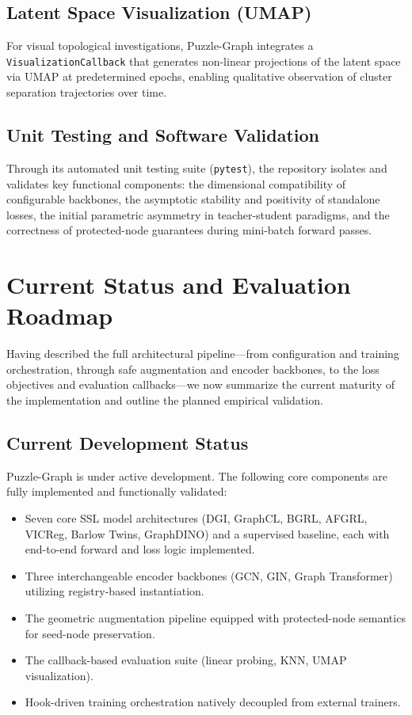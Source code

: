\documentclass[conference]{IEEEtran}
\begin{document}
\subsection{Latent Space Visualization (UMAP)}
For visual topological investigations, Puzzle-Graph integrates a \texttt{VisualizationCallback} that generates non-linear projections of the latent space via UMAP at predetermined epochs, enabling qualitative observation of cluster separation trajectories over time.

\subsection{Unit Testing and Software Validation}
Through its automated unit testing suite (\texttt{pytest}), the repository isolates and validates key functional components: the dimensional compatibility of configurable backbones, the asymptotic stability and positivity of standalone losses, the initial parametric asymmetry in teacher-student paradigms, and the correctness of protected-node guarantees during mini-batch forward passes.

\section{Current Status and Evaluation Roadmap}
\label{sec:results}
Having described the full architectural pipeline---from configuration and training orchestration, through safe augmentation and encoder backbones, to the loss objectives and evaluation callbacks---we now summarize the current maturity of the implementation and outline the planned empirical validation.

\subsection{Current Development Status}
Puzzle-Graph is under active development. The following core components are fully implemented and functionally validated:
\begin{itemize}
    \item Seven core SSL model architectures (DGI, GraphCL, BGRL, AFGRL, VICReg, Barlow Twins, GraphDINO) and a supervised baseline, each with end-to-end forward and loss logic implemented.
    \item Three interchangeable encoder backbones (GCN, GIN, Graph Transformer) utilizing registry-based instantiation.
    \item The geometric augmentation pipeline equipped with protected-node semantics for seed-node preservation.
    \item The callback-based evaluation suite (linear probing, KNN, UMAP visualization).
    \item Hook-driven training orchestration natively decoupled from external trainers.
\end{itemize}
\end{document}
